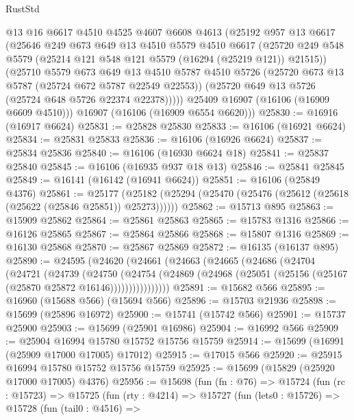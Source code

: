 \begin{lexlean}{RustStd}
\begin{coremodule}
        @13
        @16
        @6617
        @4510
        @4525
        @4607
        @6608
        @4613
        (@25192
          @957
          @13
          @6617
          (@25646
            @249
            @673
            @649
            @13
            @4510
            @5579
            @4510
            @6617
            (@25720 @249 @548 @5579 (@25214 @121 @548 @121 @5579 (@16294 (@25219 @121)) @21515))
            (@25710
              @5579
              @673
              @649
              @13
              @4510
              @5787
              @4510
              @5726
              (@25720 @673 @13 @5787 (@25724 @672 @5787 @22549 @22553))
              (@25720 @649 @13 @5726 (@25724 @648 @5726 @22374 @22378)))))
        @25409
        @16907
        (@16106 (@16909 @6609 @4510)))
      @16907
      (@16106 (@16909 @6554 @6620)))
@25830 := @16916 (@16917 @6624)
@25831 := @25828 @25830
@25833 := @16106 (@16921 @6624)
@25834 := @25831 @25833
@25836 := @16106 (@16926 @6624)
@25837 := @25834 @25836
@25840 := @16106 (@16930 @6624 @18)
@25841 := @25837 @25840
@25845 := @16106 (@16935 @937 @18 @13)
@25846 := @25841 @25845
@25849 := @16141 (@16142 (@16941 @6624))
@25851 := @16106 (@25849 @4376)
@25861 := @25177
    (@25182 (@25294 (@25470 (@25476 (@25612 (@25618 (@25622 (@25846 @25851)) @25273))))))
@25862 := @15713 @895
@25863 := @15909 @25862
@25864 := @25861 @25863
@25865 := @15783 @1316
@25866 := @16126 @25865
@25867 := @25864 @25866
@25868 := @15807 @1316
@25869 := @16130 @25868
@25870 := @25867 @25869
@25872 := @16135 (@16137 @895)
@25890 := @24595
    (@24620
      (@24661
        (@24663
          (@24665
            (@24686
              (@24704
                (@24721
                  (@24739
                    (@24750
                      (@24754
                        (@24869
                          (@24968 (@25051 (@25156 (@25167 (@25870 @25872 @16146))))))))))))))))
@25891 := @15682 @566
@25895 := @16960 (@15688 @566) (@15694 @566)
@25896 := @15703 @21936
@25898 := @15699 (@25896 @16972)
@25900 := @15741 (@15742 @566)
@25901 := @15737 @25900
@25903 := @15699 (@25901 @16986)
@25904 := @16992 @566
@25909 := @25904 @16994 @15780 @15752 @15756 @15759
@25914 := @15699 (@16991 (@25909 @17000 @17005) @17012)
@25915 := @17015 @566
@25920 := @25915 @16994 @15780 @15752 @15756 @15759
@25925 := @15699 (@15829 (@25920 @17000 @17005) @4376)
@25956 := @15698
    (fun (fn : @76) =>
    @15724
      (fun (rc : @15723) =>
      @15725
        (fun (rty : @4214) =>
        @15727
          (fun (lets0 : @15726) =>
          @15728
            (fun (tail0 : @4516) =>

\end{coremodule}
\end{lexlean}
